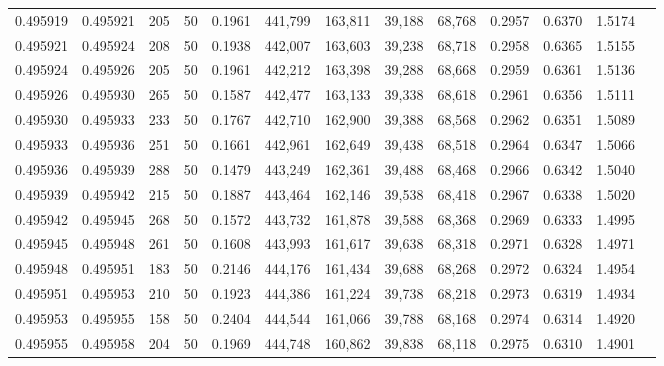 \begin{tabular}{rrrrrrrrrrrrr}
0.495919 & 0.495921 &   205 &  50 &                                     0.1961 & 441,799 & 163,811 &  39,188 &  68,768 & 0.2957 & 0.6370 & 1.5174 \\
0.495921 & 0.495924 &   208 &  50 &                                     0.1938 & 442,007 & 163,603 &  39,238 &  68,718 & 0.2958 & 0.6365 & 1.5155 \\
0.495924 & 0.495926 &   205 &  50 &                                     0.1961 & 442,212 & 163,398 &  39,288 &  68,668 & 0.2959 & 0.6361 & 1.5136 \\
0.495926 & 0.495930 &   265 &  50 &                                     0.1587 & 442,477 & 163,133 &  39,338 &  68,618 & 0.2961 & 0.6356 & 1.5111 \\
0.495930 & 0.495933 &   233 &  50 &                                     0.1767 & 442,710 & 162,900 &  39,388 &  68,568 & 0.2962 & 0.6351 & 1.5089 \\
0.495933 & 0.495936 &   251 &  50 &                                     0.1661 & 442,961 & 162,649 &  39,438 &  68,518 & 0.2964 & 0.6347 & 1.5066 \\
0.495936 & 0.495939 &   288 &  50 &                                     0.1479 & 443,249 & 162,361 &  39,488 &  68,468 & 0.2966 & 0.6342 & 1.5040 \\
0.495939 & 0.495942 &   215 &  50 &                                     0.1887 & 443,464 & 162,146 &  39,538 &  68,418 & 0.2967 & 0.6338 & 1.5020 \\
0.495942 & 0.495945 &   268 &  50 &                                     0.1572 & 443,732 & 161,878 &  39,588 &  68,368 & 0.2969 & 0.6333 & 1.4995 \\
0.495945 & 0.495948 &   261 &  50 &                                     0.1608 & 443,993 & 161,617 &  39,638 &  68,318 & 0.2971 & 0.6328 & 1.4971 \\
0.495948 & 0.495951 &   183 &  50 &                                     0.2146 & 444,176 & 161,434 &  39,688 &  68,268 & 0.2972 & 0.6324 & 1.4954 \\
0.495951 & 0.495953 &   210 &  50 &                                     0.1923 & 444,386 & 161,224 &  39,738 &  68,218 & 0.2973 & 0.6319 & 1.4934 \\
0.495953 & 0.495955 &   158 &  50 &                                     0.2404 & 444,544 & 161,066 &  39,788 &  68,168 & 0.2974 & 0.6314 & 1.4920 \\
0.495955 & 0.495958 &   204 &  50 &                                     0.1969 & 444,748 & 160,862 &  39,838 &  68,118 & 0.2975 & 0.6310 & 1.4901 \\

\end{tabular}
